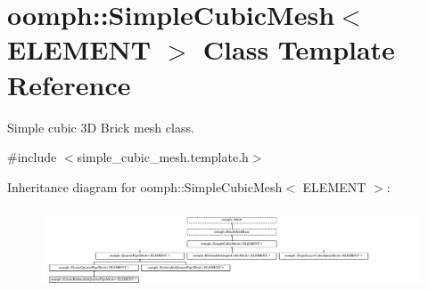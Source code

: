 \hypertarget{classoomph_1_1SimpleCubicMesh}{}\section{oomph\+:\+:Simple\+Cubic\+Mesh$<$ E\+L\+E\+M\+E\+NT $>$ Class Template Reference}
\label{classoomph_1_1SimpleCubicMesh}


Simple cubic 3D Brick mesh class.  




{\ttfamily \#include $<$simple\+\_\+cubic\+\_\+mesh.\+template.\+h$>$}

Inheritance diagram for oomph\+:\+:Simple\+Cubic\+Mesh$<$ E\+L\+E\+M\+E\+NT $>$\+:\begin{figure}[H]
\begin{center}
\leavevmode
\includegraphics[height=2.456140cm]{classoomph_1_1SimpleCubicMesh}
\end{center}
\end{figure}
